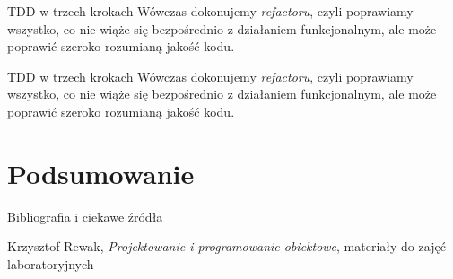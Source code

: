 \begin{frame}{TDD w trzech krokach}
	Wówczas dokonujemy \emph{refactoru}, czyli poprawiamy wszystko, co nie wiąże się bezpośrednio z działaniem funkcjonalnym, ale może poprawić szeroko rozumianą jakość kodu.
\end{frame}

\begin{frame}{TDD w trzech krokach}
	Wówczas dokonujemy \emph{refactoru}, czyli poprawiamy wszystko, co nie wiąże się bezpośrednio z działaniem funkcjonalnym, ale może poprawić szeroko rozumianą jakość kodu.
\end{frame}

\section{Podsumowanie}

\begin{frame}{Bibliografia i ciekawe źródła}
  
	\begin{thebibliography}{9}
	
		Krzysztof Rewak,
		\textit{Projektowanie i programowanie obiektowe},
		materiały do zajęć laboratoryjnych
	
	\end{thebibliography}

\end{frame}

